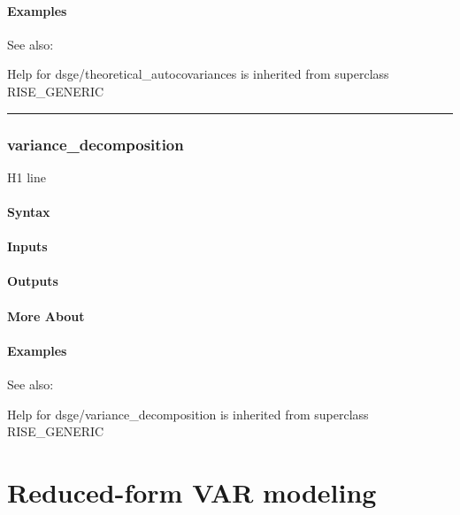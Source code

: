 \documentclass[letterpaper,10pt,english]{sphinxmanual}
\begin{document}
\subsubsection{Examples}
\label{classes/models/@dsge/dsge:id208}
See also:

Help for dsge/theoretical\_autocovariances is inherited from superclass RISE\_GENERIC


\bigskip\hrule{}\bigskip



\subsection{variance\_decomposition}
\label{classes/models/@dsge/dsge:id209}\label{classes/models/@dsge/dsge:variance-decomposition}
H1 line


\subsubsection{Syntax}
\label{classes/models/@dsge/dsge:id210}

\subsubsection{Inputs}
\label{classes/models/@dsge/dsge:id211}

\subsubsection{Outputs}
\label{classes/models/@dsge/dsge:id212}

\subsubsection{More About}
\label{classes/models/@dsge/dsge:id213}

\subsubsection{Examples}
\label{classes/models/@dsge/dsge:id214}
See also:

Help for dsge/variance\_decomposition is inherited from superclass RISE\_GENERIC


\chapter{Reduced-form VAR modeling}
\label{classes/models/@rfvar/rfvar::doc}\label{classes/models/@rfvar/rfvar:reduced-form-var-modeling}
\end{document}
